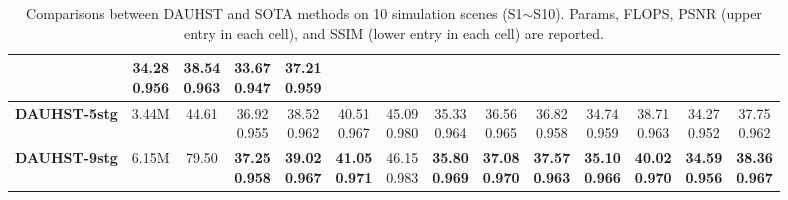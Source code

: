 \documentclass{article}
\begin{document}
\begin{table*}[t]
{\begin{tabular}{cccccccccccccc}
			&\tabincell{c}{34.28\\0.956}
			&\tabincell{c}{38.54\\0.963}
			&\tabincell{c}{33.67\\0.947}
			&\tabincell{c}{37.21\\0.959}
			\\
			\midrule
\rowcolor{rouse}
			\bf DAUHST-5stg
			& 3.44M
			& 44.61
			&\tabincell{c}{36.92\\0.955}
			&\tabincell{c}{38.52\\0.962}
			&\tabincell{c}{40.51\\0.967}
			&\tabincell{c}{45.09\\0.980}
			&\tabincell{c}{35.33\\0.964}
			&\tabincell{c}{36.56\\0.965}
			&\tabincell{c}{36.82\\0.958}
			&\tabincell{c}{34.74\\0.959}
			&\tabincell{c}{38.71\\0.963}
			&\tabincell{c}{34.27\\0.952}
			&\tabincell{c}{37.75\\0.962}
			\\
			\midrule
			\rowcolor{rouse}
			\bf DAUHST-9stg
			& 6.15M
			& 79.50
			&\tabincell{c}{\bf{37.25}\\\bf{0.958}}
			&\tabincell{c}{\bf{39.02}\\\bf{0.967}}
			&\tabincell{c}{\bf{41.05}\\\bf{0.971}}
			&\tabincell{c}{{46.15}\\{0.983}}
			&\tabincell{c}{\bf{35.80}\\\bf{0.969}}
			&\tabincell{c}{\bf{37.08}\\\bf{0.970}}
			&\tabincell{c}{\bf{37.57}\\\bf{0.963}}
			&\tabincell{c}{\bf{35.10}\\\bf{0.966}}
			&\tabincell{c}{\bf{40.02}\\\bf{0.970}}
			&\tabincell{c}{\bf{34.59}\\\bf{0.956}}
			&\tabincell{c}{\bf{38.36}\\\bf{0.967}}
			\\
			\bottomrule[0.2em]
		\end{tabular}
	}
	\vspace{-1mm}
	\caption{Comparisons between DAUHST and SOTA methods on 10 simulation scenes (S1$\sim$S10). Params, FLOPS, PSNR (upper entry in each cell), and SSIM (lower entry in each cell) are reported.}
	\vspace{-3mm}
	\label{tab:simu}
\end{table*}
\end{document}
